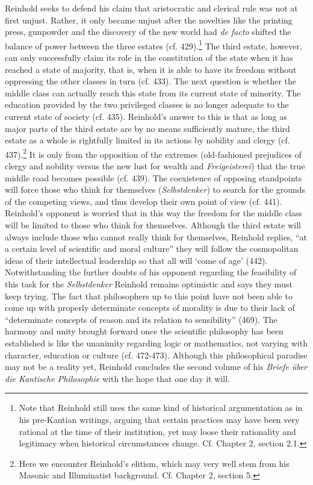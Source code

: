 Reinhold seeks to defend his claim that aristocratic and clerical rule was not at first unjust. Rather, it only became unjust after the novelties like the printing press, gunpowder and the discovery of the new world had \textit{de facto} shifted the balance of power between the three estates (cf. 429).\footnote{ Note that Reinhold still uses the same kind of historical argumentation as in his pre{-}Kantian writings, arguing that certain practices may have been very rational at the time of their institution, yet may loose their rationality and legitimacy when historical circumstances change. Cf. Chapter 2, section 2.1.} The third estate, however, can only successfully claim its role in the constitution of the state when it has reached a state of majority, that is, when it is able to have its freedom without oppressing the other classes in turn (cf. 433). The next question is whether the middle class can actually reach this state from its current state of minority. The education provided by the two privileged classes is no longer adequate to the current state of society (cf. 435). Reinhold's answer to this is that as long as major parts of the third estate are by no means sufficiently mature, the third estate as a whole is rightfully limited in its actions by nobility and clergy (cf. 437).\footnote{ Here we encounter Reinhold's elitism, which may very well stem from his Masonic and Illuminatist background. Cf. Chapter 2, section 5.} It is only from the opposition of the extremes (old{-}fashioned prejudices of clergy and nobility versus the new lust for wealth and \textit{Freigeisterei}) that the true middle road becomes possible (cf. 439). The coexistence of opposing standpoints will force those who think for themselves (\textit{Selbstdenker}) to search for the grounds of the competing views, and thus develop their own point of view (cf. 441). Reinhold's opponent is worried that in this way the freedom for the middle class will be limited to those who think for themselves. Although the third estate will always include those who cannot really think for themselves, Reinhold replies, ``at a certain level of scientific and moral culture'' they will follow the cosmopolitan ideas of their intellectual leadership so that all will `come of age' (442). Notwithstanding the further doubts of his opponent regarding the feasibility of this task for the \textit{Selbstdenker} Reinhold remains optimistic and says they must keep trying. The fact that philosophers up to this point have not been able to come up with properly determinate concepts of morality is due to their lack of ``determinate concepts of reason and its relation to sensibility'' (469). The harmony and unity brought forward once the scientific philosophy has been established is like the unanimity regarding logic or mathematics, not varying with character, education or culture (cf. 472{-}473). Although this philosophical paradise may not be a reality yet, Reinhold concludes the second volume of his \textit{Briefe \"{u}ber die Kantische Philosophie} with the hope that one day it will. 


